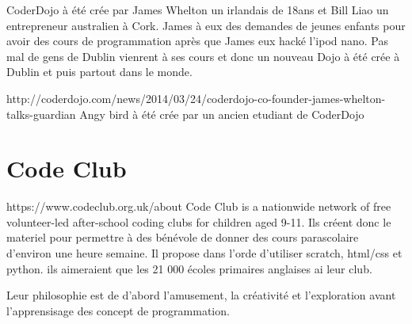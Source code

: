CoderDojo à été crée par James Whelton un irlandais de 18ans et Bill Liao un entrepreneur australien à Cork. James à eux des demandes de jeunes enfants pour avoir des cours de programmation après que James eux hacké l'ipod nano. Pas mal de gens de Dublin vienrent à ses cours et donc un nouveau Dojo à été crée à Dublin et puis partout dans le monde.

http://coderdojo.com/news/2014/03/24/coderdojo-co-founder-james-whelton-talks-guardian
Angy bird à été crée par un ancien etudiant de CoderDojo

\section{Code Club}
https://www.codeclub.org.uk/about
Code Club is a nationwide network of free volunteer-led after-school coding clubs for children aged 9-11.
Ils créent donc le materiel pour permettre à des bénévole de donner des cours parascolaire d'environ une heure semaine. Il propose dans l'orde d'utiliser scratch, html/css et python. ils aimeraient que les 21 000 écoles primaires anglaises ai leur club.

Leur philosophie est de d'abord l'amusement, la créativité et l'exploration avant l'apprensisage des concept de programmation.
